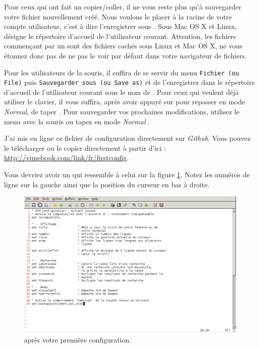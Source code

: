 Pour ceux qui ont fait un copier/coller, il ne vous reste plus qu'à sauvegarder votre fichier nouvellement créé. Nous voulons le placer à la racine de votre compte utilisateur, c'est à dire l'enregistrer sous . Sous Mac OS X et Linux, \hlred{\Verb|\textasciitilde{}|} désigne le répertoire d'accueil de l'utilisateur courant. Attention, les fichiers commençant par un  sont des fichiers cachés sous Linux et Mac OS X, ne vous étonnez donc pas de ne pas le voir par défaut dans votre navigateur de fichiers.

Pour les utilisateurs de la souris, il suffira de se servir du menu \Verb|Fichier (ou File)| puis \Verb|Sauvegarder sous (ou Save as)| et de l'enregistrer dans le répertoire d'accueil de l'utilisateur courant sous le nom de . Pour ceux qui veulent déjà utiliser le clavier, il vous suffira, après avoir appuyé sur \ttesc pour repasser en mode \emph{Normal}, de taper . Pour sauvegarder vos prochaines modifications, utilisez le menu avec la souris ou tapez en mode \emph{Normal} .

J'ai mis en ligne ce fichier de configuration directement sur \emph{Github}. Vous pouvez le télécharger ou le copier directement à partir d'ici : \url{http://vimebook.com/link/fr/firstconfig}.

Vous devriez avoir un \vim qui ressemble à celui sur la figure \ref{fig:first-config}. Notez les numéros de ligne sur la gauche ainsi que la position du curseur en bas à droite.

\begin{figure}%
  \includegraphics[width=\linewidth]{graphics/vim-first-config.png}
  \caption{\vim après votre première configuration.}
  \label{fig:first-config}
\end{figure}

